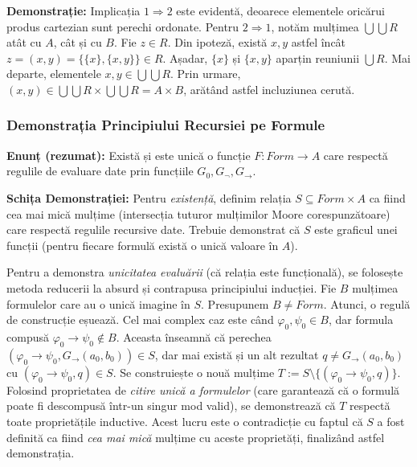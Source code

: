 \textbf{Demonstrație:}
Implicația $1 \Rightarrow 2$ este evidentă, deoarece elementele oricărui produs cartezian sunt perechi ordonate.
Pentru $2 \Rightarrow 1$, notăm mulțimea $\bigcup \bigcup R$ atât cu $A$, cât și cu $B$. Fie $z \in R$. Din ipoteză, există $x, y$ astfel încât $z = (x,y) = \{\{x\}, \{x,y\}\} \in R$.
Așadar, $\{x\}$ și $\{x,y\}$ aparțin reuniunii $\bigcup R$. Mai departe, elementele $x, y \in \bigcup \bigcup R$.
Prin urmare, $(x,y) \in \bigcup \bigcup R \times \bigcup \bigcup R = A \times B$, arătând astfel incluziunea cerută.

\subsubsection{Demonstrația Principiului Recursiei pe Formule}
\textbf{Enunț (rezumat):} Există și este unică o funcție $F : Form \rightarrow A$ care respectă regulile de evaluare date prin funcțiile $G_0, G_\neg, G_\rightarrow$.

\textbf{Schița Demonstrației:}
Pentru \textit{existență}, definim relația $S \subseteq Form \times A$ ca fiind cea mai mică mulțime (intersecția tuturor mulțimilor Moore corespunzătoare) care respectă regulile recursive date. Trebuie demonstrat că $S$ este graficul unei funcții (pentru fiecare formulă există o unică valoare în $A$).

Pentru a demonstra \textit{unicitatea evaluării} (că relația este funcțională), se folosește metoda reducerii la absurd și contrapusa principiului inducției.
Fie $B$ mulțimea formulelor care au o unică imagine în $S$. Presupunem $B \neq Form$. Atunci, o regulă de construcție eșuează. Cel mai complex caz este când $\varphi_0, \psi_0 \in B$, dar formula compusă $\varphi_0 \rightarrow \psi_0 \notin B$.
Aceasta înseamnă că perechea $(\varphi_0 \rightarrow \psi_0, G_\rightarrow(a_0, b_0)) \in S$, dar mai există și un alt rezultat $q \neq G_\rightarrow(a_0, b_0)$ cu $(\varphi_0 \rightarrow \psi_0, q) \in S$.
Se construiește o nouă mulțime $T := S \setminus \{(\varphi_0 \rightarrow \psi_0, q)\}$. Folosind proprietatea de \textit{citire unică a formulelor} (care garantează că o formulă poate fi descompusă într-un singur mod valid), se demonstrează că $T$ respectă toate proprietățile inductive.
Acest lucru este o contradicție cu faptul că $S$ a fost definită ca fiind \textit{cea mai mică} mulțime cu aceste proprietăți, finalizând astfel demonstrația.
